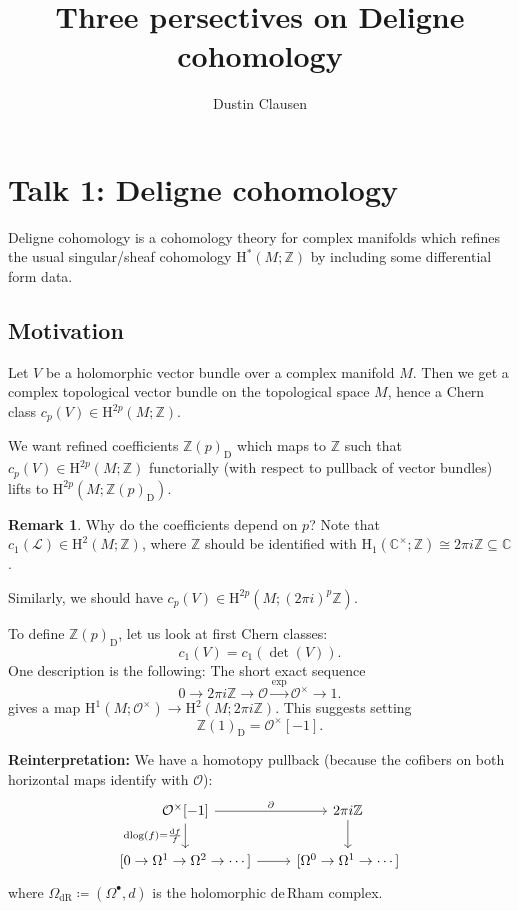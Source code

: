 \documentclass[draft]{amsart}
\newcommand{\ZZ}{\mathbb{Z}}
\newcommand{\CC}{\mathbb{C}}
\renewcommand{\H}{\mathrm{H}}
\newcommand{\D}{\mathrm{D}}
\renewcommand{\O}{\mathcal{O}}
\newcommand{\sheaf}[1]{\mathcal{#1}}
\DeclareMathOperator{\dlog}{dlog}
\theoremstyle{definition}
\newtheorem{rem}[thm]{Remark}
\begin{document}
\title{Three persectives on Deligne cohomology}
\author{Dustin Clausen}
\maketitle
\tableofcontents


\section{Talk 1: Deligne cohomology}

Deligne cohomology is a cohomology theory for complex manifolds which refines the usual singular/sheaf cohomology $\H^*(M;\ZZ)$ by including some differential form data.

\subsection{Motivation}
Let $V$ be a holomorphic vector bundle over a complex manifold $M$. Then we get a complex topological vector bundle on the topological space $M$, hence a Chern class $c_p(V) \in \H^{2p}(M;\ZZ)$.

We want refined coefficients $\ZZ(p)_{\D}$ which maps to $\ZZ$ such that $c_p(V) \in \H^{2p}(M;\ZZ)$ functorially (with respect to pullback of vector bundles) lifts to $\H^{2p}(M; \ZZ(p)_{\D})$.

\begin{rem}
Why do the coefficients depend on $p$? Note that $c_1(\sheaf L) \in \H^{2}(M;\ZZ)$, where $\ZZ$ should be identified with $\H_1(\CC^\times; \ZZ) \cong 2\pi i\ZZ \subseteq \CC$.

Similarly, we should have $c_p(V) \in \H^{2p}(M; (2\pi i)^{p}\ZZ)$.
\end{rem}

To define $\ZZ(p)_{\D}$, let us look at first Chern classes:
\[
c_1(V) = c_1(\det(V)).
\]
One description is the following: The short exact sequence
\[
0\to 2\pi i\ZZ \to \O \xrightarrow{\exp} \O^\times \to 1.
\]
gives a map $\H^1(M;\O^\times) \to \H^2(M;2\pi i\ZZ)$. This suggests setting
\[
\ZZ(1)_{\D} = \O^\times[-1].
\]

\textbf{Reinterpretation:} We have a homotopy pullback (because the cofibers on both horizontal maps identify with $\O$):
\[
\begin{tikzcd}
\O^\times{[-1]} \ar[r,"\partial"] \ar[d,"\dlog(f) = \frac{\mathrm{d} f}{f}"'] & 2\pi i\ZZ \ar[d] \\
{[0\to \Omega^1\to \Omega^2\to\dotsb]} \ar[r] & {[\Omega^0 \to \Omega^1 \to \dotsb]}
\end{tikzcd}
\]
where $\Omega_{\mathrm{dR}} \coloneqq (\Omega^\bullet,d)$ is the holomorphic de\,Rham complex.
\end{document}
